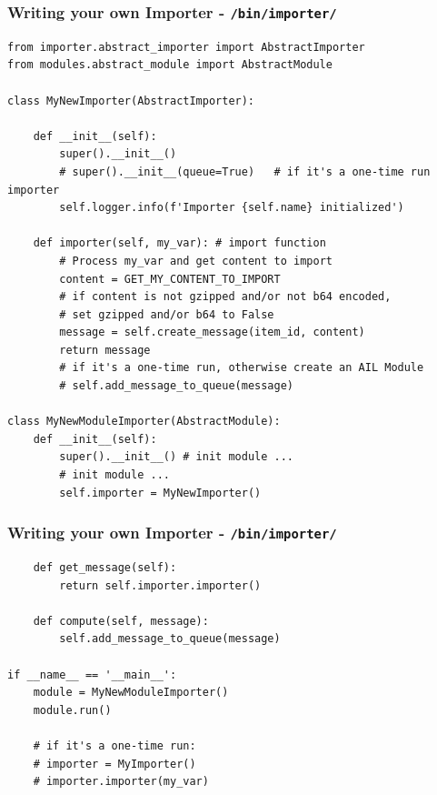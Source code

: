 \documentclass[10pt,aspectratio=169, colorlinks=true, linkcolor=circlBlue]{beamer}
\begin{document}
\begin{frame}[fragile]
    \frametitle{Writing your own Importer - \texttt{/bin/importer/}}
    \begin{tcolorbox}[colback=black!85, coltext=green, title=Importer Example:, fonttitle=\bfseries]
\begin{verbatim}
from importer.abstract_importer import AbstractImporter
from modules.abstract_module import AbstractModule

class MyNewImporter(AbstractImporter):

    def __init__(self):
        super().__init__()
        # super().__init__(queue=True)   # if it's a one-time run importer
        self.logger.info(f'Importer {self.name} initialized')

    def importer(self, my_var): # import function
        # Process my_var and get content to import
        content = GET_MY_CONTENT_TO_IMPORT
        # if content is not gzipped and/or not b64 encoded,
        # set gzipped and/or b64 to False
        message = self.create_message(item_id, content)
        return message
        # if it's a one-time run, otherwise create an AIL Module
        # self.add_message_to_queue(message)

class MyNewModuleImporter(AbstractModule):
    def __init__(self):
        super().__init__() # init module ...
        # init module ...
        self.importer = MyNewImporter()
\end{verbatim}
    \end{tcolorbox}
\end{frame}

\begin{frame}[fragile]
    \frametitle{Writing your own Importer - \texttt{/bin/importer/}}
    \begin{tcolorbox}[colback=black!85, coltext=green, title=Module Runner Example:, fonttitle=\bfseries]
\begin{verbatim}
    def get_message(self):
        return self.importer.importer()

    def compute(self, message):
        self.add_message_to_queue(message)

if __name__ == '__main__':
    module = MyNewModuleImporter()
    module.run()

    # if it's a one-time run:
    # importer = MyImporter()
    # importer.importer(my_var)
\end{verbatim}
    \end{tcolorbox}
\end{frame}
\end{document}
